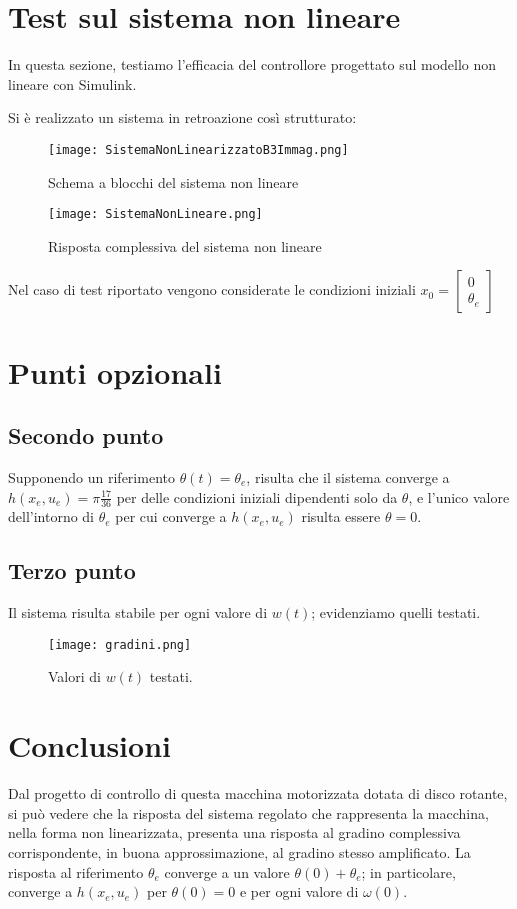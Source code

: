 \documentclass[a4paper, 11pt]{article}
\begin{document}
\section{Test sul sistema non lineare}

In questa sezione, testiamo l'efficacia del controllore progettato sul modello non lineare con Simulink.

Si è realizzato un sistema in retroazione così strutturato:

\begin{figure}[h]
	\centering
	\texttt{[image: SistemaNonLinearizzatoB3Immag.png]}
	\caption{Schema a blocchi del sistema non lineare}
	\label{fig:SistemaNonLineare}
\end{figure}


\begin{figure}[h]
	\centering
	\texttt{[image: SistemaNonLineare.png]}
	\caption{Risposta complessiva del sistema non lineare}
	\label{fig:RispostaNonLineare}
\end{figure}
Nel caso di test riportato vengono considerate le condizioni iniziali $x_0 = \begin{bmatrix}
	0 \\
	\theta_e
\end{bmatrix}$
\newpage

\section{Punti opzionali}

\subsection{Secondo punto}
Supponendo un riferimento $\theta(t) = \theta_e$, risulta che il sistema converge a $h(x_e,u_e) = \pi\frac{17}{36}$ per delle condizioni iniziali dipendenti solo da $\theta$, e l'unico valore dell'intorno di $\theta_e$ per cui converge a  $h(x_e,u_e)$ risulta essere $\theta=0$.

\subsection{Terzo punto}

Il sistema risulta stabile per ogni valore di $w(t)$; evidenziamo quelli testati.

\begin{figure}[h]
 	\centering
 	\texttt{[image: gradini.png]}
 	\caption{Valori di $w(t)$ testati.}
 	\label{fig:gradini}
\end{figure}

\section{Conclusioni}
Dal progetto di controllo di questa macchina motorizzata dotata di disco rotante,
si può vedere che la risposta del sistema regolato che rappresenta la macchina,
nella forma non linearizzata, presenta una risposta al gradino complessiva corrispondente, in buona approssimazione, al gradino stesso amplificato.
La risposta al riferimento $\theta_e$ converge a un valore $\theta(0) + \theta_e$; in particolare, converge a $h(x_e,u_e)$ per $\theta(0) = 0$ e per ogni valore di $\omega(0)$.
\end{document}
